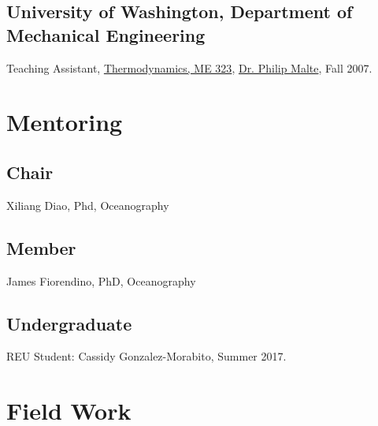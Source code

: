 \documentclass[10pt,letterpaper]{article}
\renewenvironment{itemize}{
  \begin{list}{}{
    \setlength{\leftmargin}{1.5em}
    \setlength{\itemsep}{0.25em}
    \setlength{\parskip}{0pt}
    \setlength{\parsep}{0.25em}
  }
}{
  \end{list}
}
\begin{document}
\subsection*{University of Washington, Department of Mechanical Engineering}

\begin{itemize}

\item Teaching Assistant,
  \href{http://www.washington.edu/students/crscat/meche.html#me323}{Thermodynamics, ME 323},
  \href{http://www.me.washington.edu/research/faculty/malte/}{Dr. Philip Malte},
  Fall 2007.

\end{itemize}



\section*{Mentoring}

\subsection*{Chair}

\begin{itemize}
\item Xiliang Diao, Phd, Oceanography
\end{itemize}

\subsection*{Member}

\begin{itemize}
\item James Fiorendino, PhD, Oceanography
\end{itemize}

\subsection*{Undergraduate}

\begin{itemize}
\item REU Student: Cassidy Gonzalez-Morabito, Summer 2017.
\end{itemize}



\section*{Field Work}
\end{document}
